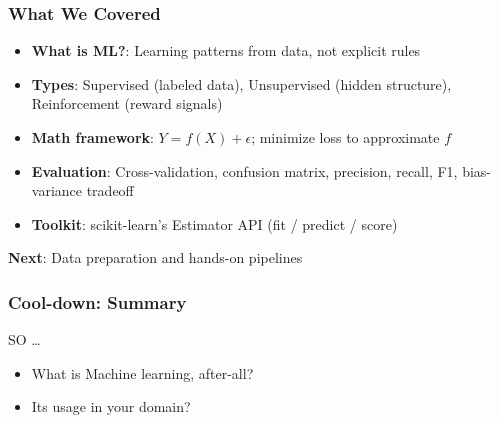 \begin{frame}[fragile]\frametitle{What We Covered}
\begin{itemize}
\item \textbf{What is ML?}: Learning patterns from data, not explicit rules
\item \textbf{Types}: Supervised (labeled data), Unsupervised (hidden structure), Reinforcement (reward signals)
\item \textbf{Math framework}: $Y = f(X) + \epsilon$; minimize loss to approximate $f$
\item \textbf{Evaluation}: Cross-validation, confusion matrix, precision, recall, F1, bias-variance tradeoff
\item \textbf{Toolkit}: scikit-learn's Estimator API (fit / predict / score)
\end{itemize}
\textbf{Next}: Data preparation and hands-on pipelines
\end{frame}

\begin{frame}[fragile]\frametitle{Cool-down: Summary}
SO \ldots
\begin{itemize}
\item What is Machine learning, after-all?
\item Its usage in your domain?
\end{itemize}
\end{frame}



